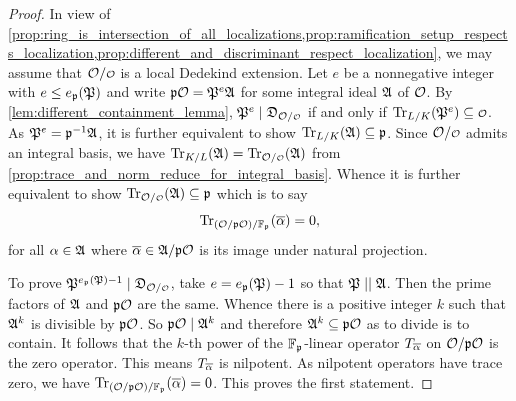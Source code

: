     \begin{proof}
      In view of \cref{prop:ring_is_intersection_of_all_localizations,prop:ramification_setup_respects_localization,prop:different_and_discriminant_respect_localization}, we may assume that \(\mc{O}/\smc{O}\) is a local Dedekind extension. Let \(e\) be a nonnegative integer with \(e \le e_{\mathfrak{p}}(\mathfrak{P})\) and write \(\mathfrak{p}\mathcal{O} = \mathfrak{P}^{e}\mathfrak{A}\) for some integral ideal \(\mathfrak{A}\) of \(\mathcal{O}\). By \cref{lem:different_containment_lemma}, \(\mf{P}^{e} \mid \mf{D}_{\mc{O}/\smc{O}}\) if and only if \(\Trace_{L/K}(\mf{P}^{e}) \subseteq \smc{O}\). As \(\mathfrak{P}^{e} = \mathfrak{p}^{-1}\mathfrak{A}\), it is further equivalent to show \(\operatorname{\mathrm{Tr}}_{L/K}(\mathfrak{A}) \subseteq \mathfrak{p}\). Since \(\mc{O}/\smc{O}\) admits an integral basis, we have \(\Trace_{K/L}(\mf{A}) = \Trace_{\mc{O}/\smc{O}}(\mf{A})\) from \cref{prop:trace_and_norm_reduce_for_integral_basis}. Whence it is further equivalent to show \(\Trace_{\mc{O}/\smc{O}}(\mf{A}) \subseteq \mf{p}\) which is to say
      \[
        \operatorname{\mathrm{Tr}}_{(\mathcal{O}/\mathfrak{p}\mathcal{O})/\mathbb{F}_{\mathfrak{p}}}(\overline{\alpha}) = 0,
      \]
      for all \(\alpha \in \mathfrak{A}\) where \(\overline{\alpha} \in \mathfrak{A}/\mathfrak{p}\mathcal{O}\) is its image under natural projection.

      To prove \(\mf{P}^{e_{\mf{p}}(\mf{P})-1} \mid \mf{D}_{\mc{O}/\smc{O}}\), take \(e = e_{\mathfrak{p}}(\mathfrak{P})-1\) so that \(\mathfrak{P} \mid\mid \mathfrak{A}\). Then the prime factors of \(\mathfrak{A}\) and \(\mathfrak{p}\mathcal{O}\) are the same. Whence there is a positive integer \(k\) such that \(\mathfrak{A}^{k}\) is divisible by \(\mathfrak{p}\mathcal{O}\). So \(\mathfrak{p}\mathcal{O} \mid \mathfrak{A}^{k}\) and therefore \(\mathfrak{A}^{k} \subseteq \mathfrak{p}\mathcal{O}\) as to divide is to contain. It follows that the \(k\)-th power of the \(\mathbb{F}_{\mathfrak{p}}\)-linear operator \(T_{\overline{\alpha}}\) on \(\mathcal{O}/\mathfrak{p}\mathcal{O}\) is the zero operator. This means \(T_{\overline{\alpha}}\) is nilpotent. As nilpotent operators have trace zero, we have \(\operatorname{\mathrm{Tr}}_{(\mathcal{O}/\mathfrak{p}\mathcal{O})/\mathbb{F}_{\mathfrak{p}}}(\overline{\alpha}) = 0\). This proves the first statement.


\end{proof}
